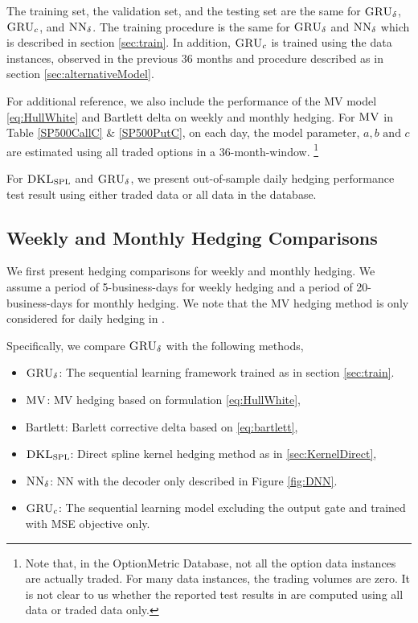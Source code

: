 \documentclass[letterpaper,12pt,titlepage,oneside,final]{book}
\numberwithin{equation}{section}
\theoremstyle{definition}
\newcommand{\model}{\textsc{GRU}_\delta}
\newcommand{\modelN}{\textsc{NN}_\delta}
\newcommand{\DKLs}{\bf\textsc{DKL}_{\text{SPL}}}
\newcommand{\MV}{\bf \textsc{MV}}
\begin{document}
 The training set, the validation set, and the testing set are the same for $\model$, $\textsc{GRU}_{c}$, and $\modelN$. The training procedure is the same for $\model$ and $\modelN$ which is described in section \ref{sec:train}. In addition, $\textsc{GRU}_{c}$ is trained using the data instances, observed in the previous 36 months and procedure described as in section \ref{sec:alternativeModel}. 
 
 For additional reference, we also include the performance of the MV model \eqref{eq:HullWhite}  and Bartlett delta on weekly and monthly hedging. For $\MV$ in Table \ref{SP500CallC} \& \ref{SP500PutC}, on each day,  the model parameter, $a,b \text{ and } c$ are estimated using all {traded} options in a 36-month-window. \footnote{Note that, in the OptionMetric Database, not all the option data instances are actually traded. For many data instances, the trading volumes are zero. It is not clear to us whether the reported test results in \citep{hulloptimal} are computed using all data or traded data only.} 






 For $\DKLs$ and $\model$, we present out-of-sample daily hedging performance test result using either {traded} data or {all} data in the database.  


\subsection{Weekly and Monthly Hedging Comparisons}\label{sec:weekly}



We  first present hedging comparisons for weekly and monthly hedging. We assume a period of 5-business-days  for weekly hedging and a  period of  20-business-days  for monthly hedging.
We note that the MV hedging method is only considered for daily hedging in \cite{hulloptimal}.

Specifically, we compare $\model$ with the following methods,
\begin{itemize}
	\item $\model$: The sequential learning framework trained as in section \ref{sec:train}.
	\item $\MV$: MV hedging   based on formulation \eqref{eq:HullWhite},
    \item Bartlett: Barlett corrective  delta based on \eqref{eq:bartlett},
    \item $\DKLs$: Direct spline kernel hedging method as in \ref{sec:KernelDirect},
    \item $\modelN$: NN with the decoder only described in Figure \ref{fig:DNN}.
    \item $\textsc{GRU}_{c}$: The sequential learning model excluding the output gate and  trained with MSE objective only.
\end{itemize}
\end{document}

